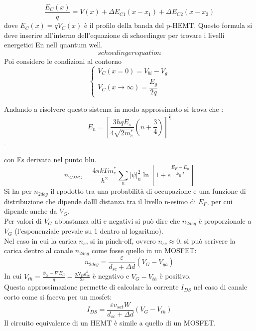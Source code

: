 \begin{equation}
    \dfrac{E_C(x)}{q}=V(x)+\Delta E_{C1}(x-x_1)+\Delta E_{C2}(x-x_2)
\end{equation}
dove $E_C(x)=qV_C(x)$ è il profilo della banda del p-HEMT.
Questo formula si deve inserire all'interno dell'equazione di schoedinger per trovare i livelli energetici En nell quantum well.\\
\begin{equation}
    schoedinger equation
\end{equation}
Poi considero le condizioni al contorno
\begin{equation}
    \begin{cases}
        V_C(x=0)=V_{bi}-V_g\\
        V_C(x\rightarrow \infty)=\dfrac{E_g}{2q}
    \end{cases}
\end{equation}

Andando a risolvere questo sistema in modo approssimato si trova che :
\begin{equation}
    E_n=\left[\dfrac{3hqE_s}{4\sqrt{2m_e^*}}(n+\dfrac{3}{4})\right]^{\frac{2}{3}}
\end{equation}
-


con Es derivata nel punto blu.
\begin{equation}
   n_{2DEG}=\dfrac{4\pi kTm_e^*}{h^2}\sum_n \left| \psi \right|_n^2 \ln{\left[ 1+e^{\dfrac{E_F-E_n}{k_BT}}\right]}
\end{equation}
Si ha per $n_{2deg}$ il rpodotto tra una probabilità di occupazione e una funzione di distribuzione che dipende dalll distanza tra il livello n-esimo di $E_F$, per cui dipende anche da $V_G$.\\
Per valori di $V_G$ abbastanza alti e negativi si può dire che $n_{2deg}$ è proporzionale a $V_G$ (l'esponenziale prevale su 1 dentro al logaritmo).\\
Nel caso in cui la carica $n_{sc}$ si in pinch-off, ovvero $n_{sc} \approx 0$, si può scrivere la carica dentro al canale $n_{2deg}$ come fosse quello in un MOSFET:
\begin{equation}
    n_{2deg}=\dfrac{\varepsilon}{d_{sc}+\Delta d}(V_G-V_{yh})
\end{equation}
In cui $V_{th}=\frac{\phi_{bi}-\nabla E_C}{q}-\frac{qN_D d_{sc}^2}{2\varepsilon}$ è negativo e $V_G-V_{th}$ è positivo.\\
Questa approssimazione permette di calcolare la corrente $I_{DS}$ nel caso di canale corto come si faceva per un mosfet:
\begin{equation}
    I_{DS}=\dfrac{\varepsilon v_{sat} W}{d_{sc}+\Delta d}(V_G-V_{th})
\end{equation}
Il circuito equivalente di un HEMT è simile a quello di un MOSFET.


